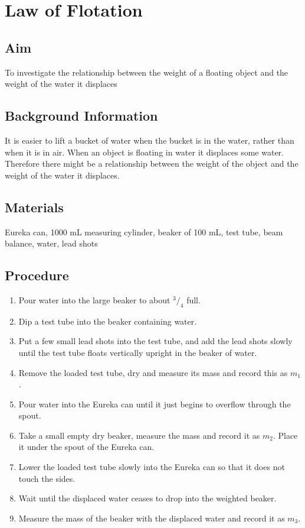 \chapter{Law of Flotation}

\section{Aim}
To investigate the relationship between the weight of a floating object and the weight of the water it displaces

\section{Background Information}
It is easier to lift a bucket of water when the bucket is in the water, rather than when it is in air. When an object is floating in water it displaces some water. Therefore there might be a relationship between the weight of the object and the weight of the water it displaces.

\section{Materials}
Eureka can, 1000 mL measuring cylinder, beaker of 100 mL, test tube, beam balance, water, lead shots

\section{Procedure}
\begin{enumerate}
\item Pour water into the large beaker to about $^3/_4$ full.
\item Dip a test tube into the beaker containing water.
\item Put a few small lead shots into the test tube, and add the lead shots slowly until the test tube floats vertically upright in the beaker of water. 
\item Remove the loaded test tube, dry and measure its mass and record this as $m_1$.
\item Pour water into the Eureka can until it just begins to overflow through the spout.
\item Take a small empty dry beaker, measure the mass and record it as $m_2$. Place it under the spout of the Eureka can.
\item Lower the loaded test tube slowly into the Eureka can so that it does not touch the sides.
\item Wait until the displaced water ceases to drop into the weighted beaker.
\item Measure the mass of the beaker with the displaced water and record it as $m_3$.
\end{enumerate}

